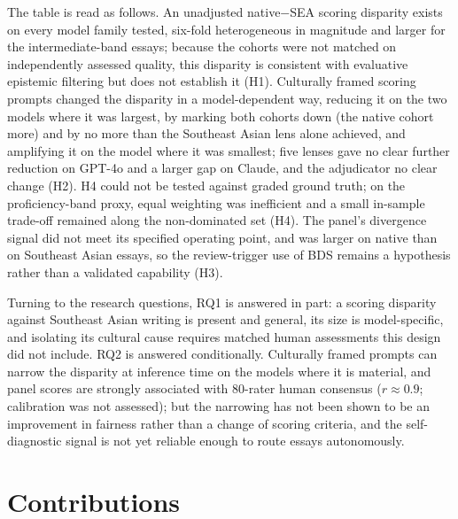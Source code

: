 The table is read as follows. An unadjusted native$-$SEA scoring
disparity exists on every model family tested, six-fold heterogeneous
in magnitude and larger for the intermediate-band essays; because the
cohorts were not matched on independently assessed quality, this
disparity is consistent with evaluative epistemic filtering but does
not establish it (H1). Culturally framed scoring prompts changed
the disparity in a model-dependent way, reducing it on the two
models where it was largest, by marking both cohorts down (the
native cohort more) and by no more than the Southeast Asian lens
alone achieved, and amplifying it on the model where it was
smallest; five lenses gave no clear further reduction on GPT-4o and
a larger gap on Claude, and the adjudicator no clear change (H2).
H4 could not be tested against graded ground truth; on the
proficiency-band proxy, equal weighting was inefficient and a small
in-sample trade-off remained along the non-dominated set (H4). The panel's
divergence signal did not meet its specified operating point, and
was larger on native than on Southeast Asian essays, so the
review-trigger use of BDS remains a hypothesis rather than a
validated capability (H3).

Turning to the research questions, RQ1 is answered in part: a
scoring disparity against Southeast Asian writing is present and
general, its size is model-specific, and isolating its cultural
cause requires matched human assessments this design did not
include. RQ2 is answered conditionally. Culturally
framed prompts can narrow the disparity at inference time on the
models where it is material, and panel scores are strongly associated with 80-rater human
consensus ($r \approx 0.9$; calibration was not assessed);
but the narrowing has not been shown to be an improvement in
fairness rather than a change of scoring criteria, and the
self-diagnostic signal is not yet reliable enough to route essays
autonomously.

\section{Contributions}
\label{sec:conclusion-contributions}

